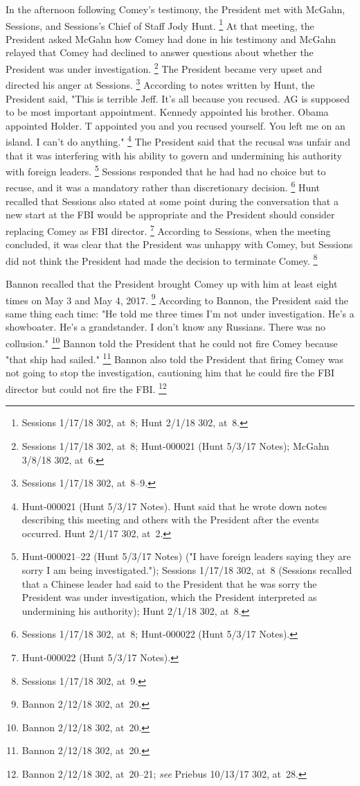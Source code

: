 {In the afternoon following Comey's testimony, the President met with McGahn, Sessions, and Sessions's Chief of Staff Jody Hunt.%
\footnote{Sessions 1/17/18 302, at~8;
Hunt 2/1/18 302, at~8.}
At that meeting, the President asked McGahn how Comey had done in his testimony and McGahn relayed that Comey had declined to answer questions about whether the President was under investigation.%
\footnote{Sessions 1/17/18 302, at~8;
Hunt-000021 (Hunt 5/3/17 Notes);
McGahn 3/8/18 302, at~6.}
The President became very upset and directed his anger at Sessions.%
\footnote{Sessions 1/17/18 302, at~8--9.}
According to notes written by Hunt, the President said, "This is terrible Jeff.
It's all because you recused.
AG is supposed to be most important appointment.
Kennedy appointed his brother.
Obama appointed Holder. T appointed you and you recused yourself.
You left me on an island.
I can't do anything."%
\footnote{Hunt-000021 (Hunt 5/3/17 Notes).
Hunt said that he wrote down notes describing this meeting and others with the President after the events occurred.
Hunt 2/1/17 302, at~2.}
The President said that the recusal was unfair and that it was interfering with his ability to govern and undermining his authority with foreign leaders.%
\footnote{Hunt-000021--22 (Hunt 5/3/17 Notes) ("I have foreign leaders saying they are sorry I am being investigated.");
Sessions 1/17/18 302, at~8 (Sessions recalled that a Chinese leader had said to the President that he was sorry the President was under investigation, which the President interpreted as undermining his authority);
Hunt 2/1/18 302, at~8.}
Sessions responded that he had had no choice but to recuse, and it was a mandatory rather than discretionary decision.%
\footnote{Sessions 1/17/18 302, at~8;
Hunt-000022 (Hunt 5/3/17 Notes).}
Hunt recalled that Sessions also stated at some point during the conversation that a new start at the FBI would be appropriate and the President should consider replacing Comey as FBI director.%
\footnote{Hunt-000022 (Hunt 5/3/17 Notes).}
According to Sessions, when the meeting concluded, it was clear that the President was unhappy with Comey, but Sessions did not think the President had made the decision to terminate Comey.%
\footnote{Sessions 1/17/18 302, at~9.}

Bannon recalled that the President brought Comey up with him at least eight times on May 3 and May 4, 2017.%
\footnote{Bannon 2/12/18 302, at~20.}
According to Bannon, the President said the same thing each time:
"He told me three times I'm not under investigation.
He's a showboater.
He's a grandstander.
I don't know any Russians.
There was no collusion."%
\footnote{Bannon 2/12/18 302, at~20.}
Bannon told the President that he could not fire Comey because "that ship had sailed."%
\footnote{Bannon 2/12/18 302, at~20.}
Bannon also told the President that firing Comey was not going to stop the investigation, cautioning him that he could fire the FBI director but could not fire the FBI\null.%
\footnote{Bannon 2/12/18 302, at~20--21;
\textit{see} Priebus 10/13/17 302, at~28.}

}
